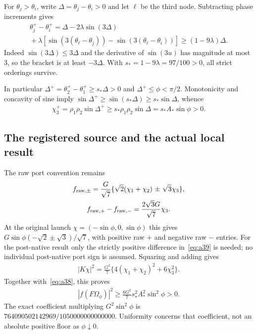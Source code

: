 For $\theta_j>\theta_i$, write $\Delta=\theta_j-\theta_i>0$ and let $\ell$ be the third node. Subtracting phase increments gives
\begin{equation}\label{eq:a37}%
\begin{gathered}
\theta_j^+-\theta_i^+
=\Delta-2\lambda\sin(3\Delta)
\\ {}+\lambda[\sin(3(\theta_\ell-\theta_j))-\sin(3(\theta_\ell-\theta_i))]
\ge(1-9\lambda)\Delta.
\end{gathered}
\end{equation}
Indeed $\sin(3\Delta)\le3\Delta$ and the derivative of $\sin(3u)$ has magnitude at most $3$, so the bracket is at least $-3\Delta$. With $s_*=1-9\lambda=97/100>0$, all strict orderings survive.

In particular $\Delta^+=\theta_2^+-\theta_1^+\ge s_*\Delta>0$ and $\Delta^+\le\phi<\pi/2$. Monotonicity and concavity of sine imply $\sin\Delta^+\ge\sin(s_*\Delta)\ge s_*\sin\Delta$, whence
\begin{equation}\label{eq:a38}%
\begin{gathered}
\chi_3^+=\rho_1\rho_2\sin\Delta^+
\ge s_*\rho_1\rho_2\sin\Delta=s_*A_*\sin\phi>0.
\end{gathered}
\end{equation}

\subsection{The registered source and the actual local result}\label{sec:source}
The raw port convention remains
\begin{equation}\label{eq:a39}%
\begin{gathered}
f_{{\rm raw},\pm}=\frac G{\sqrt7}
\{\sqrt2(\chi_1+\chi_2)\ \mathord{\pm}\ \sqrt3\chi_3\},\\ f_{{\rm raw},+}-f_{{\rm raw},-}=\frac{2\sqrt3G}{\sqrt7}\chi_3.
\end{gathered}
\end{equation}
At the original launch $\chi=(-\sin\phi,0,\sin\phi)$ this gives $G\sin\phi(-\sqrt2\pm\sqrt3)/\sqrt7$, with positive raw $+$ and negative raw $-$ entries. For the post-native result only the strictly positive difference in~\eqref{eq:a39} is needed; no individual post-native port sign is assumed. Squaring and adding gives
\begin{equation}\label{eq:a40}%
\begin{gathered}
|K\chi|^2=\frac{G^2}{7}\{4(\chi_1+\chi_2)^2+6\chi_3^2\}.
\end{gathered}
\end{equation}
Together with~\eqref{eq:a38}, this proves
\begin{equation}\label{eq:a41}%
\begin{gathered}
|f(F\Omega_\phi)|^2\ge
\frac{6G^2}{7}s_*^2A_*^2\sin^2\phi>0.
\end{gathered}
\end{equation}
The exact coefficient multiplying $G^2\sin^2\phi$ is
$764090502142969/1050000000000000$.
Uniformity concerns that coefficient, not an absolute positive floor as $\phi\downarrow0$.

